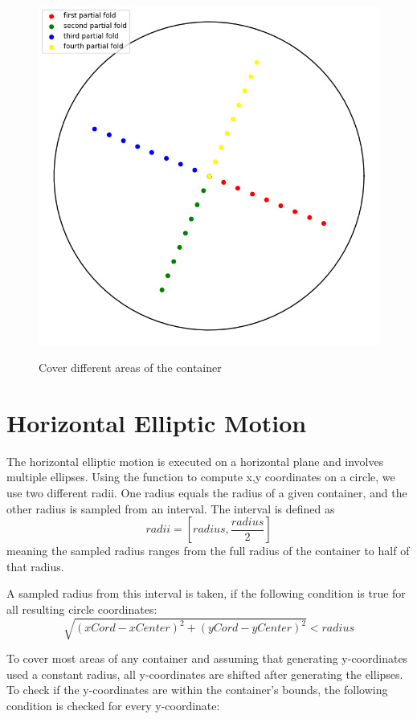 \begin{figure}[H]
    \includegraphics[scale=0.35]{Graphics/motions/folding1.png}
    \centering
    \label{fig:foldingMotion1}
    \caption{Cover different areas of the container}
\end{figure}

\section{Horizontal Elliptic Motion}
The horizontal elliptic motion is executed on a horizontal plane and involves multiple ellipses.
Using the function to compute x,y coordinates on a circle, we use two different radii.
One radius equals the radius of a given container, and the other radius is sampled from an interval. The interval is defined as \[radii = [radius, \frac{radius} {2} ]\]
meaning the sampled radius ranges from the full radius of the container to half of that radius.


A sampled radius from this interval is taken, if the following condition is true for all resulting circle coordinates:
\[\sqrt{(xCord - xCenter)^2 + (yCord - yCenter)^2} < radius\] 

To cover most areas of any container and assuming that generating y-coordinates used a constant radius, all y-coordinates are shifted after generating the ellipses. 
To check if the y-coordinates are within the container's bounds, the following condition is checked for every y-coordinate:

